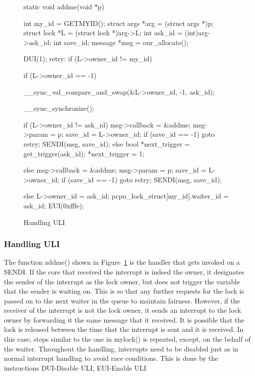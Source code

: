 \begin{figure}
\begin{code} 
static void addme(void *p)
{
    int my_id = GETMYID();
    struct args *arg = (struct args *)p;
    struct lock *L = (struct lock *)arg->L;
    int ask_id = (int)arg->ask_id;
    int save_id;
    message *msg = our_allocate();

    DUI(1);
retry:
    if (L->owner_id != my_id) {
        if (L->owner_id == -1) {
            __sync_val_compare_and_swap(&L->owner_id, -1, ask_id);

            __sync_synchronize();

            if (L->owner_id != ask_id) {
                msg->callback = &addme;
                msg->param = p;
                save_id = L->owner_id;
                if (save_id == -1)
                    goto retry;
                SENDI(msg, save_id);
            } else {
                bool *next_trigger = get_trigger(ask_id);
                *next_trigger = 1;
            }
        } else {
            msg->callback = &addme;
            msg->param = p;
            save_id = L->owner_id;
            if (save_id == -1)
                goto retry;
            SENDI(msg, save_id);
        }
    } else {
        L->owner_id = ask_id;
        pcpu_lock_struct[my_id].waiter_id = ask_id;
    }
    EUI(0xfffe);
}
\end{code}
\caption{Handling ULI\label{fig-locking_cont}}
\end{figure}

\subsubsection{Handling ULI}

The function addme() shown in Figure~\ref{fig-locking_cont} is the handler that
gets invoked on a SENDI. If the core that received the interrupt is indeed the
owner, it designates the sender of the interrupt as the lock owner, but does not
trigger the variable that the sender is waiting on. This is so that any further
requests for the lock is passed on to the next waiter in the queue to maintain
fairness. However, if the receiver of the interrupt is not the lock owner, it
sends an interrupt to the lock owner by forwarding it the same message that it
received. It is possible that the lock is released between the time that the
interrupt is sent and it is received. In this case, steps similar to the one in
mylock() is repeated, except, on the behalf of the waiter. Throughout the
handling, interrupts need to be disabled just as in normal interrupt handling
to avoid race conditions. This is done by the instructions DUI-Disable ULI,
EUI-Enable ULI

